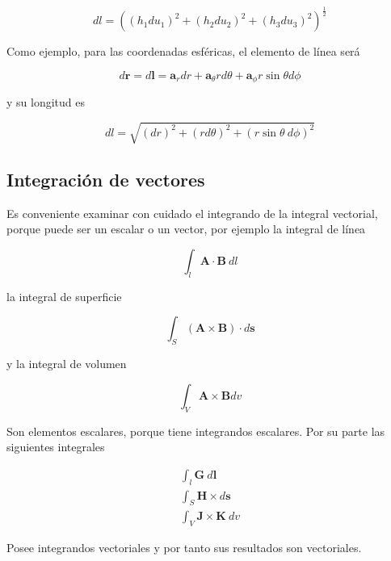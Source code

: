 \begin{equation*}
d l = \left( (h_1 d u_1)^2 + (h_2 d u_2)^2 + (h_3 d u_3)^2 \right)^{\frac{1}{2}}
\end{equation*}

Como ejemplo, para las coordenadas esféricas, el elemento de línea será

\begin{equation*}
d \mathbf{r} = d \mathbf{l} = \mathbf{a}_r d r + \mathbf{a}_\theta r d \theta + \mathbf{a}_\phi r \sin \theta d \phi  
\end{equation*}

y su longitud es

\begin{equation*}
dl = \sqrt{(dr)^2 + (r d\theta)^2 + (r \sin \theta \ d \phi)^2}
\end{equation*}

\subsection{Integración de vectores}

 Es conveniente examinar con cuidado el integrando de la integral vectorial, porque puede ser un escalar o un vector, por ejemplo la integral de línea 

\begin{equation*}
\int_{l} \mathbf{A} \cdot \mathbf{B} \ d l  
\end{equation*}

 la integral de superficie

\begin{equation*}
\int_S (\mathbf{A} \times \mathbf{B}) \cdot d\mathbf{s}
\end{equation*}

y la integral de volumen

\begin{equation*}
\int_V \mathbf{A} \times \mathbf{B} dv
\end{equation*}

Son elementos escalares, porque tiene integrandos escalares. Por su parte las siguientes integrales

\begin{eqnarray*}
\int_l \mathbf{G} \ d\mathbf{l} \\
\int_S \mathbf{H} \times d \mathbf{s} \\
\int_V \mathbf{J} \times \mathbf{K} \ dv
\end{eqnarray*}

Posee integrandos vectoriales y por tanto sus resultados son vectoriales.

